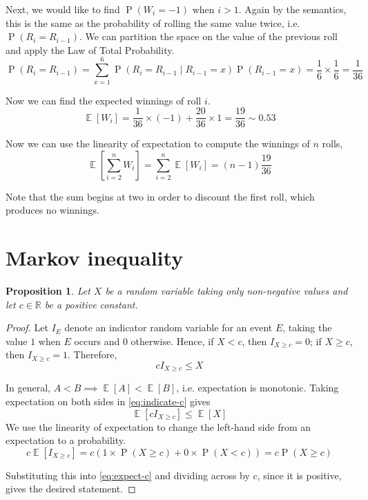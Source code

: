 \documentclass[letterpaper,11pt]{article}
\newtheorem{prop}{Proposition}
\DeclareMathOperator{\Prob}{P}
\renewcommand{\P}[1]{\Prob{\parens{#1}}}
\DeclareMathOperator{\Expect}{\mathbb{E}}
\newcommand{\E}[1]{\Expect{\left[#1\right]}}
\newcommand{\R}{\mathbb{R}}
\newcommand{\parens}[1]{\left(#1\right)}
\newcommand{\given}{\;\vert\;}
\newcommand{\question}{\section}
\begin{document}
Next, we would like to find $\P{W_i = -1}$ when $i > 1$.
Again by the semantics, this is the same as the probability of rolling the same
value twice, i.e. $\P{R_i = R_{i-1}}$. We can partition the space on the value
of the previous roll and apply the Law of Total Probability.
\begin{equation*}
    \P{R_i = R_{i-1}}
    = \sum_{x = 1}^6 {
        \P{R_i = R_{i-1} \given R_{i-1} = x} \P{R_{i-1} = x}
    }
    = \frac{1}{6} \times \frac{1}{6}
    = \frac{1}{36}
\end{equation*}

Now we can find the expected winnings of roll $i$.
\begin{equation*}
    \E{W_i}
    = \frac{1}{36} \times (-1)
    + \frac{20}{36} \times 1
    = \frac{19}{36}
    \sim 0.53
\end{equation*}

Now we can use the linearity of expectation to compute the winnings of $n$
rolls,
\begin{equation*}
    \E{\sum_{i=2}^n W_i} = \sum_{i=2}^n \E{W_i} = (n-1)\frac{19}{36}
\end{equation*}

Note that the sum begins at two in order to discount the first roll, which
produces no winnings.

\question{Markov inequality}

\begin{prop}
    Let $X$ be a random variable taking only non-negative values and let
    $c \in \R$ be a positive constant.
\end{prop}

\begin{proof}
    Let $I_E$ denote an indicator random variable for an event $E$, taking the
    value $1$ when $E$ occurs and $0$ otherwise.
    Hence, if $X < c$, then $I_{X \geq c} = 0$;
    if $X \geq c$, then $I_{X \geq c} = 1$.
    Therefore,
    \begin{equation}
        \label{eq:indicate-c}
        c I_{X \geq c} \leq X
    \end{equation}

    In general, $A < B \implies \E{A} < \E{B}$, i.e. expectation is monotonic.
    Taking expectation on both sides in \eqref{eq:indicate-c} gives
    \begin{equation}
        \label{eq:expect-c}
        \E{c I_{X \geq c}} \leq \E{X}
    \end{equation}
    We use the linearity of expectation to change the left-hand side from an
    expectation to a probability.
    \begin{equation*}
        c \E{I_{X \geq c}}
        = c \parens{
            1 \times \P{X \geq c}
            + 
            0 \times \P{X < c}
        }
        = c \P{X \geq c}
    \end{equation*}

    Substituting this into \eqref{eq:expect-c} and dividing across by $c$,
    since it is positive, gives the desired statement.
\end{proof}
\end{document}
